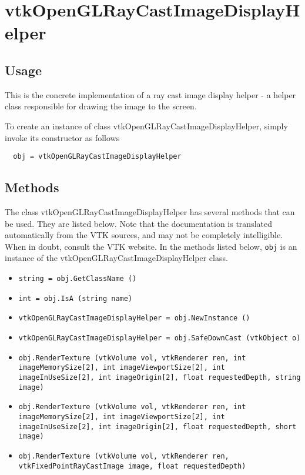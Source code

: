 \section{vtkOpenGLRayCastImageDisplayHelper}

\subsection{Usage}

 This is the concrete implementation of a ray cast image display helper -
 a helper class responsible for drawing the image to the screen.

To create an instance of class vtkOpenGLRayCastImageDisplayHelper, simply
invoke its constructor as follows
\begin{verbatim}
  obj = vtkOpenGLRayCastImageDisplayHelper
\end{verbatim}
\subsection{Methods}

The class vtkOpenGLRayCastImageDisplayHelper has several methods that can be used.
  They are listed below.
Note that the documentation is translated automatically from the VTK sources,
and may not be completely intelligible.  When in doubt, consult the VTK website.
In the methods listed below, \verb|obj| is an instance of the vtkOpenGLRayCastImageDisplayHelper class.
\begin{itemize}
\item  \verb|string = obj.GetClassName ()|

\item  \verb|int = obj.IsA (string name)|

\item  \verb|vtkOpenGLRayCastImageDisplayHelper = obj.NewInstance ()|

\item  \verb|vtkOpenGLRayCastImageDisplayHelper = obj.SafeDownCast (vtkObject o)|

\item  \verb|obj.RenderTexture (vtkVolume vol, vtkRenderer ren, int imageMemorySize[2], int imageViewportSize[2], int imageInUseSize[2], int imageOrigin[2], float requestedDepth, string image)|

\item  \verb|obj.RenderTexture (vtkVolume vol, vtkRenderer ren, int imageMemorySize[2], int imageViewportSize[2], int imageInUseSize[2], int imageOrigin[2], float requestedDepth, short image)|

\item  \verb|obj.RenderTexture (vtkVolume vol, vtkRenderer ren, vtkFixedPointRayCastImage image, float requestedDepth)|

\end{itemize}
